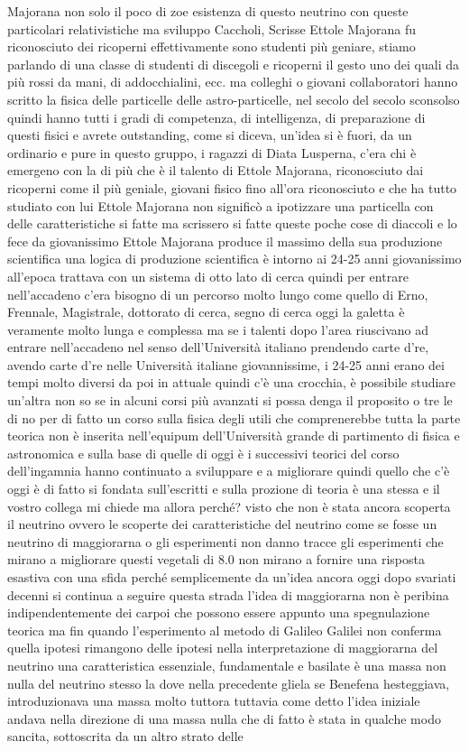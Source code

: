 Majorana non solo il poco di zoe esistenza di questo neutrino con queste particolari relativistiche ma sviluppo Caccholi, Scrisse Ettole Majorana fu riconosciuto dei ricoperni effettivamente sono studenti più geniare, stiamo parlando di una classe di studenti di discegoli e ricoperni il gesto uno dei quali da più rossi da mani, di addocchialini, ecc. ma colleghi o giovani collaboratori hanno scritto la fisica delle particelle delle astro-particelle, nel secolo del secolo sconsolso quindi hanno tutti i gradi di competenza, di intelligenza, di preparazione di questi fisici e avrete outstanding, come si diceva, un'idea si è fuori, da un ordinario e pure in questo gruppo, i ragazzi di Diata Lusperna, c'era chi è emergeno con la di più che è il talento di Ettole Majorana, riconosciuto dai ricoperni come il più geniale, giovani fisico fino all'ora riconosciuto e che ha tutto studiato con lui Ettole Majorana non significò a ipotizzare una particella con delle caratteristiche si fatte ma scrissero si fatte queste poche cose di diaccoli e lo fece da giovanissimo Ettole Majorana produce il massimo della sua produzione scientifica una logica di produzione scientifica è intorno ai 24-25 anni giovanissimo all'epoca trattava con un sistema di otto lato di cerca quindi per entrare nell'accadeno c'era bisogno di un percorso molto lungo come quello di Erno, Frennale, Magistrale, dottorato di cerca, segno di cerca oggi la galetta è veramente molto lunga e complessa ma se i talenti dopo l'area riuscivano ad entrare nell'accadeno nel senso dell'Università italiano prendendo carte d're, avendo carte d're nelle Università italiane giovannissime, i 24-25 anni erano dei tempi molto diversi da poi in attuale quindi c'è una crocchia, è possibile studiare un'altra non so se in alcuni corsi più avanzati si possa denga il proposito o tre le di no per di fatto un corso sulla fisica degli utili che comprenerebbe tutta la parte teorica non è inserita nell'equipum dell'Università grande di partimento di fisica e astronomica e sulla base di quelle di oggi è i successivi teorici del corso dell'ingamnia hanno continuato a sviluppare e a migliorare quindi quello che c'è oggi è di fatto si fondata sull'escritti e sulla prozione di teoria è una stessa e il vostro collega mi chiede ma allora perché? visto che non è stata ancora scoperta il neutrino ovvero le scoperte dei caratteristiche del neutrino come se fosse un neutrino di maggiorarna o gli esperimenti non danno tracce gli esperimenti che mirano a migliorare questi vegetali di 8.0 non mirano a fornire una risposta esastiva con una sfida perché semplicemente da un'idea ancora oggi dopo svariati decenni si continua a seguire questa strada l'idea di maggiorarna non è peribina indipendentemente dei carpoi che possono essere appunto una spegnulazione teorica ma fin quando l'esperimento al metodo di Galileo Galilei non conferma quella ipotesi rimangono delle ipotesi nella interpretazione di maggiorarna del neutrino una caratteristica essenziale, fundamentale e basilate è una massa non nulla del neutrino stesso la dove nella precedente gliela se Benefena hesteggiava, introduzionava una massa molto tuttora tuttavia come detto l'idea iniziale andava nella direzione di una massa nulla che di fatto è stata in qualche modo sancita, sottoscrita da un altro strato delle 